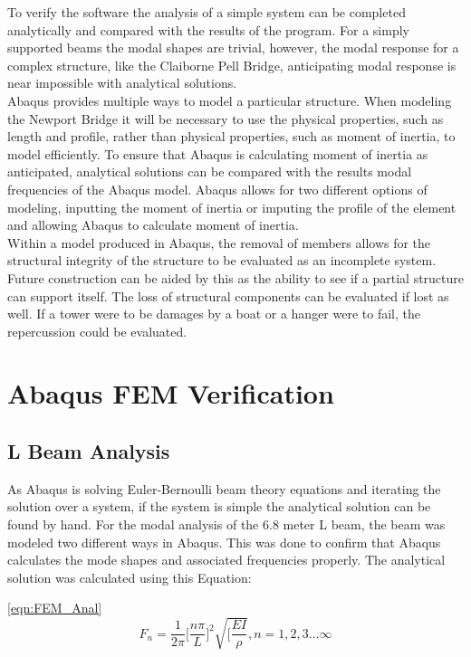 \indent To verify the software the analysis of a simple system can be completed analytically and compared with the results of the program. For a simply
supported beams the modal shapes are trivial, however, the modal response for a complex structure, like the Claiborne Pell Bridge, anticipating modal
response is near impossible with analytical solutions. \\
\indent Abaqus provides multiple ways to model a particular structure. When modeling the Newport Bridge it will be necessary to use the physical
properties, such as length and profile, rather than physical properties, such as moment of inertia, to model efficiently. To ensure that Abaqus is
calculating moment of inertia as anticipated, analytical solutions can be compared with the results modal frequencies of the Abaqus model. Abaqus allows
for two different options of modeling, inputting the moment of inertia or imputing the profile of the element and allowing Abaqus to calculate moment
of inertia. \\
\indent Within a model produced in Abaqus, the removal of members allows for the structural integrity of the structure to be evaluated as an incomplete
system. Future construction can be aided by this as the ability to see if a partial structure can support itself. The loss of structural components can
be evaluated if lost as well. If a tower were to be damages by a boat or a hanger were to fail, the repercussion could be evaluated. 

\section{Abaqus FEM Verification}

\subsection{L Beam Analysis}

As Abaqus is solving Euler-Bernoulli beam theory equations and iterating the solution over a system, if the system is simple the analytical solution can be
found by hand. For the modal analysis of the 6.8 meter L beam, the beam was modeled two different ways in Abaqus. This was done to confirm that Abaqus
calculates the mode shapes and associated frequencies properly. The analytical solution was calculated using this Equation:


\ref{eqn:FEM_Anal}\\

\begin{equation}

F_{n}=\frac{1}{2\pi}\biggl[\frac{n \pi}{L} \biggr]^{2}\sqrt{[\frac{EI}{\rho}} , n=1,2,3\dots\infty

\label{eqn:FEM_Anal}

\end{equation}

